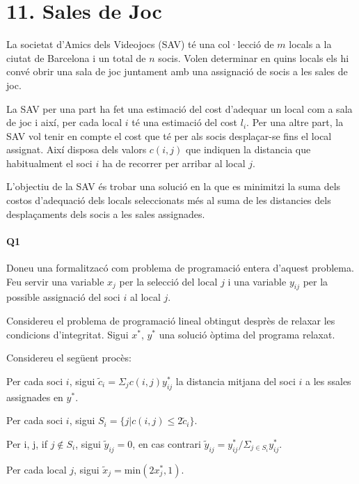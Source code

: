 \section*{11. Sales de Joc}


La societat d'Amics dels Videojocs (SAV) té una col·lecció de $m$  locals a la ciutat de Barcelona i un total de $n$  socis. Volen determinar en quins locals els hi convé obrir una sala de joc juntament amb una assignació de socis a les sales de joc.

La SAV per una part ha fet una estimació del cost d'adequar un local com a sala de joc i així, per cada local $i$ té una estimació del cost $l_i$. Per una altre part, la SAV vol tenir en compte el cost que té per als socis desplaçar-se fins el local assignat. Així disposa dels valors $c(i,j)$ que indiquen la distancia que habitualment el soci $i$ ha de recorrer per arribar al local $j$.

L'objectiu de la SAV és trobar una solució en la que es minimitzi la suma dels costos d'adequació dels locals seleccionats més al suma de les distancies dels desplaçaments dels socis a les sales assignades.

\paragraph{Q1}
Doneu una formalitzacó com problema de programació entera d'aquest problema. Feu servir una variable $x_j$ per la selecció del local $j$ i una variable $y_{ij}$ per la possible assignació del soci $i$ al local $j$.

Considereu el problema de programació lineal obtingut desprès de relaxar les condicions d'integritat. Sigui $x^*$, $y^*$ una solució òptima del programa relaxat.

Considereu el següent procès:
\begin{enumerate}[label=(\alph*)]{
\item Per cada soci $i$, sigui $\tilde{c}_i =  \Sigma_j c(i,j)y^*_{ij} $ la distancia mitjana del soci $i$ a les ssales assignades en $y^*$.
\item Per cada soci $i$, sigui $S_i = \{j | c(i,j) \leq 2\tilde{c}_i\}$.
\item Per i, j, if $j \notin S_i$, sigui $\tilde{y}_{ij} = 0$, en cas contrari $\tilde{y}_{ij} = y^*_{ij}/\Sigma_{j \in S_i} y^*_{ij}$.
\item Per cada local $j$, sigui $\tilde{x}_j = \textrm{min}(2x^*_j, 1)$. 
}

\end{enumerate}

